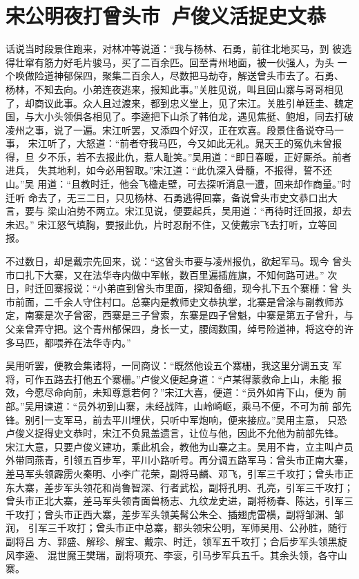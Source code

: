 \chapter{宋公明夜打曾头市~卢俊义活捉史文恭}

话说当时段景住跑来，对林冲等说道：“我与杨林、石勇，前往北地买马，到
彼选得壮窜有筋力好毛片骏马，买了二百余匹。回至青州地面，被一伙强人，为头
一个唤做险道神郁保四，聚集二百余人，尽数把马劫夺，解送曾头市去了。石勇、
杨林，不知去向。小弟连夜逃来，报知此事。”关胜见说，叫且回山寨与哥哥相见
了，却商议此事。众人且过渡来，都到忠义堂上，见了宋江。关胜引单廷圭、魏定
国，与大小头领俱各相见了。李逵把下山杀了韩伯龙，遇见焦挺、鲍旭，同去打破
凌州之事，说了一遍。宋江听罢，又添四个好汉，正在欢喜。段景住备说夺马一事，
宋江听了，大怒道：“前者夺我马匹，今又如此无礼。晁天王的冤仇未曾报得，旦
夕不乐，若不去报此仇，惹人耻笑。”吴用道：“即日春暖，正好厮杀。前者进兵，
失其地利，如今必用智取。”宋江道：“此仇深入骨髓，不报得，誓不还山。”吴
用道：“且教时迁，他会飞檐走壁，可去探听消息一遭，回来却作商量。”时迁听
命去了，无三二日，只见杨林、石勇逃得回寨，备说曾头市史文恭口出大言，要与
梁山泊势不两立。宋江见说，便要起兵，吴用道：“再待时迁回报，却去未迟。”
宋江怒气填胸，要报此仇，片时忍耐不住，又使戴宗飞去打听，立等回报。

不过数日，却是戴宗先回来，说：“这曾头市要与凌州报仇，欲起军马。现今
曾头市口扎下大寨，又在法华寺内做中军帐，数百里遍插旌旗，不知何路可进。”
次日，时迁回寨报说：“小弟直到曾头市里面，探知备细，现今扎下五个寨栅：曾
头市前面，二千余人守住村口。总寨内是教师史文恭执掌，北寨是曾涂与副教师苏
定，南寨是次子曾密，西寨是三子曾索，东寨是四子曾魁，中寨是第五子曾升，与
父亲曾弄守把。这个青州郁保四，身长一丈，腰阔数围，绰号险道神，将这夺的许
多马匹，都喂养在法华寺内。”

吴用听罢，便教会集诸将，一同商议：“既然他设五个寨栅，我这里分调五支
军将，可作五路去打他五个寨栅。”卢俊义便起身道：“卢某得蒙救命上山，未能
报效，今愿尽命向前，未知尊意若何？”宋江大喜，便道：“员外如肯下山，便为
前部。”吴用谏道：“员外初到山寨，未经战阵，山岭崎岖，乘马不便，不可为前
部先锋。别引一支军马，前去平川埋伏，只听中军炮响，便来接应。”吴用主意，
只恐卢俊义捉得史文恭时，宋江不负晁盖遗言，让位与他，因此不允他为前部先锋。
宋江大意，只要卢俊义建功，乘此机会，教他为山寨之主。吴用不肯，立主叫卢员
外带同燕青，引领五百步军，平川小路听号。再分调五路军马：曾头市正南大寨，
差马军头领霹雳火秦明、小李广花荣，副将马麟、邓飞，引军三千攻打；曾头市正
东大寨，差步军头领花和尚鲁智深、行者武松，副将孔明、孔亮，引军三千攻打；
曾头市正北大寨，差马军头领青面兽杨志、九纹龙史进，副将杨春、陈达，引军三
千攻打；曾头市正西大寨，差步军头领美髯公朱仝、插翅虎雷横，副将邹渊、邹润，
引军三千攻打；曾头市正中总寨，都头领宋公明，军师吴用、公孙胜，随行副将吕
方、郭盛、解珍、解宝、戴宗、时迁，领军五千攻打；合后步军头领黑旋风李逵、
混世魔王樊瑞，副将项充、李衮，引马步军兵五千。其余头领，各守山寨。

